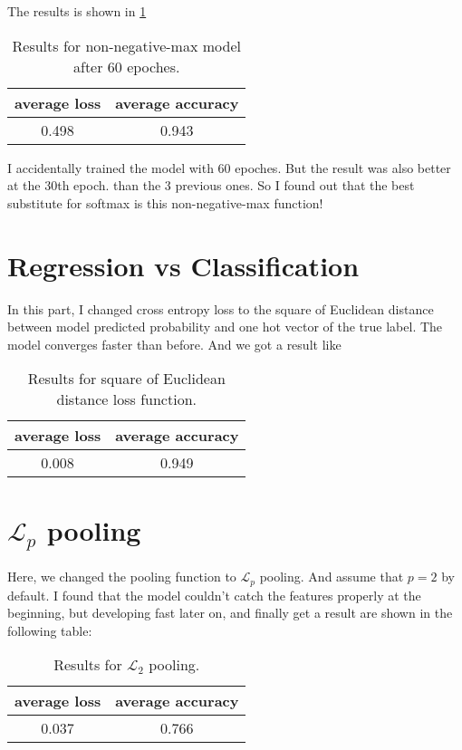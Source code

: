 \documentclass[12pt]{extarticle}
\begin{document}
The results is shown in \ref{table:5}

	\begin{table}[h]
		\centering
	\begin{tabular}{ |c| c|}
		\hline
		average loss & average accuracy \\ 
		\hline
		0.498 & 0.943 \\  
		\hline
	\end{tabular}

\caption{Results for non-negative-max model after 60 epoches.}
\label{table:5}
\end{table}

I accidentally trained the model with 60 epoches. But the result was also better at the 30th epoch. than the 3 previous ones. So I found out that the best substitute for softmax is this non-negative-max function! 

\section{Regression vs Classification}

In this part, I changed cross entropy loss to the square of Euclidean distance between model predicted probability and one hot vector of the true label. The model converges faster than before. And we got a result like 
\begin{table}[h]
	\centering
\begin{tabular}{ |c| c|}
	\hline
	average loss & average accuracy \\ 
	\hline
	0.008 & 0.949 \\  
	\hline
\end{tabular}

\caption{Results for square of Euclidean distance loss function.}
\label{table:6}
\end{table}

\section{$\mathcal{L}_p$ pooling}

Here, we changed the pooling function to $\mathcal{L}_p$ pooling. And assume that $p=2$ by default. I found that the model couldn't catch the features properly at the beginning, but developing fast later on, and finally get a result are shown in the following table:
\begin{table}[h]
	\centering
\begin{tabular}{ |c| c|}
	\hline
	average loss & average accuracy \\ 
	\hline
	0.037 & 0.766 \\  
	\hline
\end{tabular}

\caption{Results for $\mathcal{L}_2$ pooling.}
\label{table:7}
\end{table}
\end{document}
